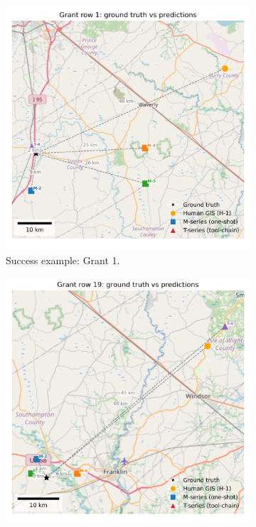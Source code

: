 \begin{figure}[H]
\centering
\begin{subfigure}{0.48\textwidth}
  \centering
  \includegraphics[width=\linewidth,height=0.35\textheight,keepaspectratio]{figures/map_outputs/grant_1_map.png}
  \caption{Success example: Grant 1.}
  \label{fig:grant1}
\end{subfigure}
\hfill %
\begin{subfigure}{0.48\textwidth}
  \centering
  \includegraphics[width=\linewidth,height=0.35\textheight,keepaspectratio]{figures/map_outputs/grant_19_map.png}

\end{subfigure}
\end{figure}
